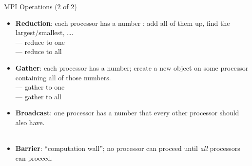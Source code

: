 \begin{frame}[shrink]
  \begin{block}{MPI Operations (2 of 2)}\pause
    \begin{itemize}
      \item \textbf{Reduction}:  each processor has a number ; add all of them up, find the largest/smallest, \dots .\\
       --- reduce to one\\
       --- reduce to all\\[.4cm]
      \item \textbf{Gather}: each processor has a number; create a new object on some processor containing all of those numbers.\\
       --- gather to one\\
       --- gather to all\\[.4cm]
      \item \textbf{Broadcast}: one processor has a number  that every other processor should also have.\\
      \\[.4cm]
      \item \textbf{Barrier}: ``computation wall''; no processor can proceed until \emph{all} processors can proceed.\\
    \end{itemize}
  \end{block}
\end{frame}




